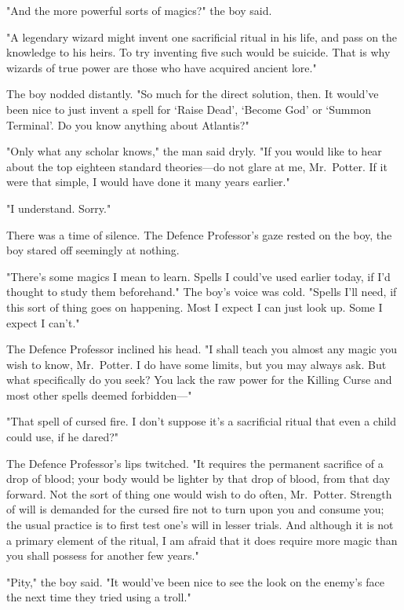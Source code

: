 "And the more powerful sorts of magics?" the boy said.

"A legendary wizard might invent one sacrificial ritual in his life, and pass
on the knowledge to his heirs. To try inventing five such would be suicide.
That is why wizards of true power are those who have acquired ancient lore."

The boy nodded distantly. "So much for the direct solution, then. It would've
been nice to just invent a spell for `Raise Dead', `Become God' or `Summon
Terminal'. Do you know anything about Atlantis?"

"Only what any scholar knows," the man said dryly. "If you would like to hear
about the top eighteen standard theories---do not glare at me, Mr.~Potter. If
it were that simple, I would have done it many years earlier."

"I understand. Sorry."

There was a time of silence. The Defence Professor's gaze rested on the boy,
the boy stared off seemingly at nothing.

"There's some magics I mean to learn. Spells I could've used earlier today, if
I'd thought to study them beforehand." The boy's voice was cold. "Spells I'll
need, if this sort of thing goes on happening. Most I expect I can just look
up. Some I expect I can't."

The Defence Professor inclined his head. "I shall teach you almost any magic
you wish to know, Mr.~Potter. I do have some limits, but you may always ask.
But what specifically do you seek? You lack the raw power for the Killing Curse
and most other spells deemed forbidden---"

"That spell of cursed fire. I don't suppose it's a sacrificial ritual that even
a child could use, if he dared?"

The Defence Professor's lips twitched. "It requires the permanent sacrifice of
a drop of blood; your body would be lighter by that drop of blood, from that
day forward. Not the sort of thing one would wish to do often, Mr.~Potter.
Strength of will is demanded for the cursed fire not to turn upon you and
consume you; the usual practice is to first test one's will in lesser trials.
And although it is not a primary element of the ritual, I am afraid that it
does require more magic than you shall possess for another few years."

"Pity," the boy said. "It would've been nice to see the look on the enemy's
face the next time they tried using a troll."

